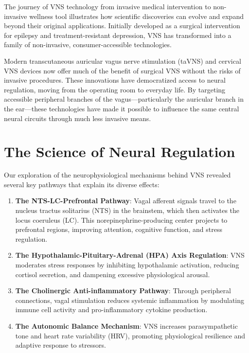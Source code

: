\documentclass[
  Letterpaper,
]{scrbook}
\begin{document}
The journey of VNS technology from invasive medical intervention to
non-invasive wellness tool illustrates how scientific discoveries can
evolve and expand beyond their original applications. Initially
developed as a surgical intervention for epilepsy and
treatment-resistant depression, VNS has transformed into a family of
non-invasive, consumer-accessible technologies.

Modern transcutaneous auricular vagus nerve stimulation (taVNS) and
cervical VNS devices now offer much of the benefit of surgical VNS
without the risks of invasive procedures. These innovations have
democratized access to neural regulation, moving from the operating room
to everyday life. By targeting accessible peripheral branches of the
vagus---particularly the auricular branch in the ear---these
technologies have made it possible to influence the same central neural
circuits through much less invasive means.

\section{The Science of Neural
Regulation}\label{the-science-of-neural-regulation}

Our exploration of the neurophysiological mechanisms behind VNS revealed
several key pathways that explain its diverse effects:

\begin{enumerate}
\def\labelenumi{\arabic{enumi}.}
\item
  \textbf{The NTS-LC-Prefrontal Pathway}: Vagal afferent signals travel
  to the nucleus tractus solitarius (NTS) in the brainstem, which then
  activates the locus coeruleus (LC). This norepinephrine-producing
  center projects to prefrontal regions, improving attention, cognitive
  function, and stress regulation.
\item
  \textbf{The Hypothalamic-Pituitary-Adrenal (HPA) Axis Regulation}: VNS
  moderates stress responses by inhibiting hypothalamic activation,
  reducing cortisol secretion, and dampening excessive physiological
  arousal.
\item
  \textbf{The Cholinergic Anti-inflammatory Pathway}: Through peripheral
  connections, vagal stimulation reduces systemic inflammation by
  modulating immune cell activity and pro-inflammatory cytokine
  production.
\item
  \textbf{The Autonomic Balance Mechanism}: VNS increases
  parasympathetic tone and heart rate variability (HRV), promoting
  physiological resilience and adaptive response to stressors.
\end{enumerate}
\end{document}

